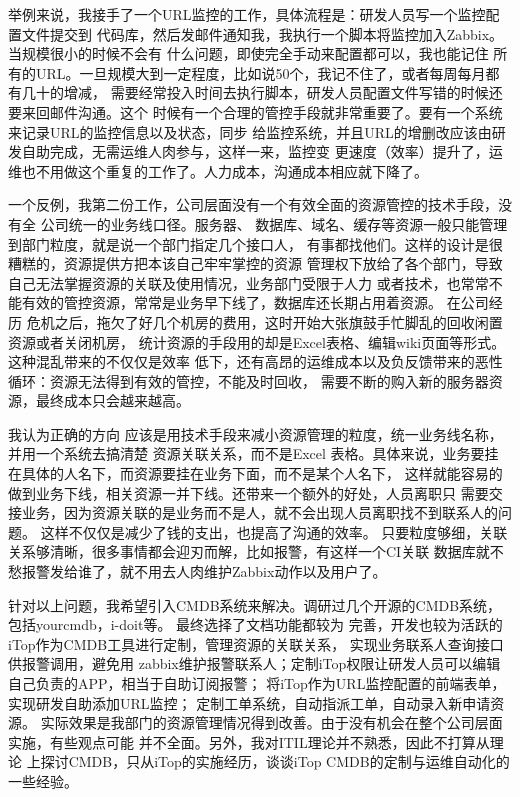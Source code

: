 \documentclass[fancyhdr,bookmark]{ctexbook}
\begin{document}
举例来说，我接手了一个URL监控的工作，具体流程是：研发人员写一个监控配置文件提交到
代码库，然后发邮件通知我，我执行一个脚本将监控加入Zabbix。当规模很小的时候不会有
什么问题，即使完全手动来配置都可以，我也能记住
所有的URL。一旦规模大到一定程度，比如说50个，我记不住了，或者每周每月都有几十的增减，
需要经常投入时间去执行脚本，研发人员配置文件写错的时候还要来回邮件沟通。这个
时候有一个合理的管控手段就非常重要了。要有一个系统来记录URL的监控信息以及状态，同步
给监控系统，并且URL的增删改应该由研发自助完成，无需运维人肉参与，这样一来，监控变
更速度（效率）提升了，运维也不用做这个重复的工作了。人力成本，沟通成本相应就下降了。

一个反例，我第二份工作，公司层面没有一个有效全面的资源管控的技术手段，没有全
公司统一的业务线口径。服务器、
数据库、域名、缓存等资源一般只能管理到部门粒度，就是说一个部门指定几个接口人，
有事都找他们。这样的设计是很糟糕的，资源提供方把本该自己牢牢掌控的资源
管理权下放给了各个部门，导致自己无法掌握资源的关联及使用情况，业务部门受限于人力
或者技术，也常常不能有效的管控资源，常常是业务早下线了，数据库还长期占用着资源。
在公司经历
危机之后，拖欠了好几个机房的费用，这时开始大张旗鼓手忙脚乱的回收闲置资源或者关闭机房，
统计资源的手段用的却是Excel表格、编辑wiki页面等形式。这种混乱带来的不仅仅是效率
低下，还有高昂的运维成本以及负反馈带来的恶性循环：资源无法得到有效的管控，不能及时回收，
需要不断的购入新的服务器资源，最终成本只会越来越高。

我认为正确的方向
应该是用技术手段来减小资源管理的粒度，统一业务线名称，并用一个系统去搞清楚
资源关联关系，而不是Excel
表格。具体来说，业务要挂在具体的人名下，而资源要挂在业务下面，而不是某个人名下，
这样就能容易的做到业务下线，相关资源一并下线。还带来一个额外的好处，人员离职只
需要交接业务，因为资源关联的是业务而不是人，就不会出现人员离职找不到联系人的问题。
这样不仅仅是减少了钱的支出，也提高了沟通的效率。
只要粒度够细，关联关系够清晰，很多事情都会迎刃而解，比如报警，有这样一个CI关联
数据库就不愁报警发给谁了，就不用去人肉维护Zabbix动作以及用户了。

针对以上问题，我希望引入CMDB系统来解决。调研过几个开源的CMDB系统，包括yourcmdb，i-doit等。
最终选择了文档功能都较为
完善，开发也较为活跃的iTop作为CMDB工具进行定制，管理资源的关联关系，
实现业务联系人查询接口供报警调用，避免用
zabbix维护报警联系人；定制iTop权限让研发人员可以编辑自己负责的APP，相当于自助订阅报警；
将iTop作为URL监控配置的前端表单，实现研发自助添加URL监控；
定制工单系统，自动指派工单，自动录入新申请资源。
实际效果是我部门的资源管理情况得到改善。由于没有机会在整个公司层面实施，有些观点可能
并不全面。另外，我对ITIL理论并不熟悉，因此不打算从理论
上探讨CMDB，只从iTop的实施经历，谈谈iTop
CMDB的定制与运维自动化的一些经验。
\end{document}
